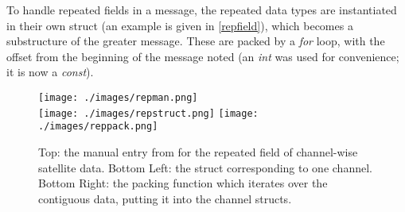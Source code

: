 
To handle repeated fields in a message, the repeated data types are instantiated in their own struct (an example is given in \autoref{repfield}), which becomes a substructure of the greater message. These are packed by a \textit{for} loop, with the offset from the beginning of the message noted (an \textit{int} was used for convenience; it is now a \textit{const}). 

\begin{figure}[H]
\centering
\texttt{[image: ./images/repman.png]} \vspace{10 pt} \\

\texttt{[image: ./images/repstruct.png]}
\texttt{[image: ./images/reppack.png]}
\caption[Handling Repeated Fields]{Top: the manual entry from \textcite{m12muser} for the repeated field of channel-wise satellite data. Bottom Left: the struct corresponding to one channel. Bottom Right: the packing function which iterates over the contiguous data, putting it into the channel structs.}
\label{repfield}
\end{figure}

